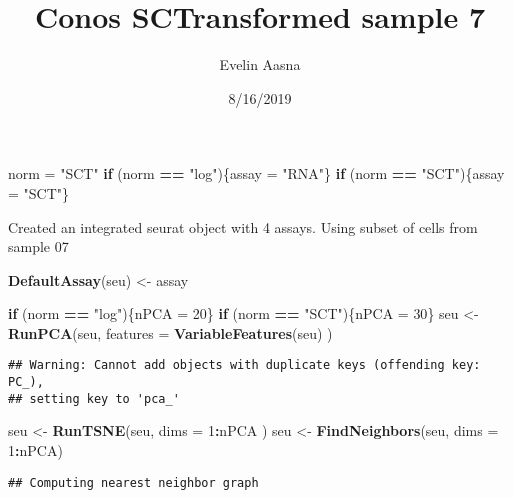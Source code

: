\documentclass[]{article}
\title{Conos SCTransformed sample 7}
\author{Evelin Aasna}
\date{8/16/2019}
\newenvironment{Shaded}{\begin{snugshade}}{\end{snugshade}}
\newcommand{\ControlFlowTok}[1]{\textcolor[rgb]{0.13,0.29,0.53}{\textbf{#1}}}
\newcommand{\DataTypeTok}[1]{\textcolor[rgb]{0.13,0.29,0.53}{#1}}
\newcommand{\DecValTok}[1]{\textcolor[rgb]{0.00,0.00,0.81}{#1}}
\newcommand{\KeywordTok}[1]{\textcolor[rgb]{0.13,0.29,0.53}{\textbf{#1}}}
\newcommand{\NormalTok}[1]{#1}
\newcommand{\OperatorTok}[1]{\textcolor[rgb]{0.81,0.36,0.00}{\textbf{#1}}}
\newcommand{\StringTok}[1]{\textcolor[rgb]{0.31,0.60,0.02}{#1}}
\begin{document}
\maketitle

\begin{Shaded}
\begin{Highlighting}[]
\NormalTok{norm =}\StringTok{ "SCT"}
\ControlFlowTok{if}\NormalTok{ (norm }\OperatorTok{==}\StringTok{ "log"}\NormalTok{)\{assay =}\StringTok{ "RNA"}\NormalTok{\}}
\ControlFlowTok{if}\NormalTok{ (norm }\OperatorTok{==}\StringTok{ "SCT"}\NormalTok{)\{assay =}\StringTok{ "SCT"}\NormalTok{\}}
\end{Highlighting}
\end{Shaded}

Created an integrated seurat object with 4 assays. Using subset of cells
from sample 07

\begin{Shaded}
\begin{Highlighting}[]
\KeywordTok{DefaultAssay}\NormalTok{(seu) <-}\StringTok{ }\NormalTok{assay}

\ControlFlowTok{if}\NormalTok{ (norm }\OperatorTok{==}\StringTok{ "log"}\NormalTok{)\{nPCA =}\StringTok{ }\DecValTok{20}\NormalTok{\}}
\ControlFlowTok{if}\NormalTok{ (norm }\OperatorTok{==}\StringTok{ "SCT"}\NormalTok{)\{nPCA =}\StringTok{ }\DecValTok{30}\NormalTok{\}}
\NormalTok{seu <-}\StringTok{ }\KeywordTok{RunPCA}\NormalTok{(seu, }\DataTypeTok{features =} \KeywordTok{VariableFeatures}\NormalTok{(seu) )}
\end{Highlighting}
\end{Shaded}

\begin{verbatim}
## Warning: Cannot add objects with duplicate keys (offending key: PC_),
## setting key to 'pca_'
\end{verbatim}

\begin{Shaded}
\begin{Highlighting}[]
\NormalTok{seu <-}\StringTok{ }\KeywordTok{RunTSNE}\NormalTok{(seu, }\DataTypeTok{dims =} \DecValTok{1}\OperatorTok{:}\NormalTok{nPCA )}
\NormalTok{seu <-}\StringTok{ }\KeywordTok{FindNeighbors}\NormalTok{(seu, }\DataTypeTok{dims =} \DecValTok{1}\OperatorTok{:}\NormalTok{nPCA)}
\end{Highlighting}
\end{Shaded}

\begin{verbatim}
## Computing nearest neighbor graph
\end{verbatim}
\end{document}
